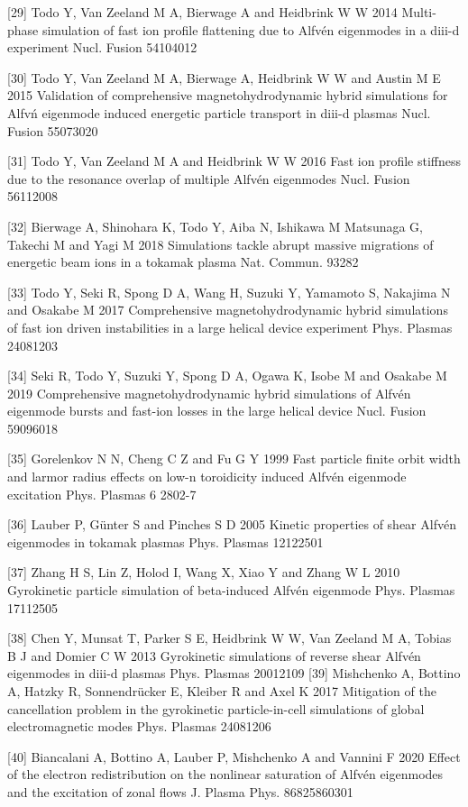 \documentclass[10pt]{article}
\begin{document}
[29] Todo Y, Van Zeeland M A, Bierwage A and Heidbrink W W 2014 Multi-phase simulation of fast ion profile flattening due to Alfvén eigenmodes in a diii-d experiment Nucl. Fusion 54104012

[30] Todo Y, Van Zeeland M A, Bierwage A, Heidbrink W W and Austin M E 2015 Validation of comprehensive magnetohydrodynamic hybrid simulations for Alfvń eigenmode induced energetic particle transport in diii-d plasmas Nucl. Fusion 55073020

[31] Todo Y, Van Zeeland M A and Heidbrink W W 2016 Fast ion profile stiffness due to the resonance overlap of multiple Alfvén eigenmodes Nucl. Fusion 56112008

[32] Bierwage A, Shinohara K, Todo Y, Aiba N, Ishikawa M Matsunaga G, Takechi M and Yagi M 2018 Simulations tackle abrupt massive migrations of energetic beam ions in a tokamak plasma Nat. Commun. 93282

[33] Todo Y, Seki R, Spong D A, Wang H, Suzuki Y, Yamamoto S, Nakajima N and Osakabe M 2017 Comprehensive magnetohydrodynamic hybrid simulations of fast ion driven instabilities in a large helical device experiment Phys. Plasmas 24081203

[34] Seki R, Todo Y, Suzuki Y, Spong D A, Ogawa K, Isobe M and Osakabe M 2019 Comprehensive magnetohydrodynamic hybrid simulations of Alfvén eigenmode bursts and fast-ion losses in the large helical device Nucl. Fusion 59096018

[35] Gorelenkov N N, Cheng C Z and Fu G Y 1999 Fast particle finite orbit width and larmor radius effects on low-n toroidicity induced Alfvén eigenmode excitation Phys. Plasmas 6 2802-7

[36] Lauber P, Günter S and Pinches S D 2005 Kinetic properties of shear Alfvén eigenmodes in tokamak plasmas Phys. Plasmas 12122501

[37] Zhang H S, Lin Z, Holod I, Wang X, Xiao Y and Zhang W L 2010 Gyrokinetic particle simulation of beta-induced Alfvén eigenmode Phys. Plasmas 17112505

[38] Chen Y, Munsat T, Parker S E, Heidbrink W W, Van Zeeland M A, Tobias B J and Domier C W 2013 Gyrokinetic simulations of reverse shear Alfvén eigenmodes in diii-d plasmas Phys. Plasmas 20012109 [39] Mishchenko A, Bottino A, Hatzky R, Sonnendrücker E, Kleiber R and Axel K 2017 Mitigation of the cancellation problem in the gyrokinetic particle-in-cell simulations of global electromagnetic modes Phys. Plasmas 24081206

[40] Biancalani A, Bottino A, Lauber P, Mishchenko A and Vannini F 2020 Effect of the electron redistribution on the nonlinear saturation of Alfvén eigenmodes and the excitation of zonal flows J. Plasma Phys. 86825860301
\end{document}
